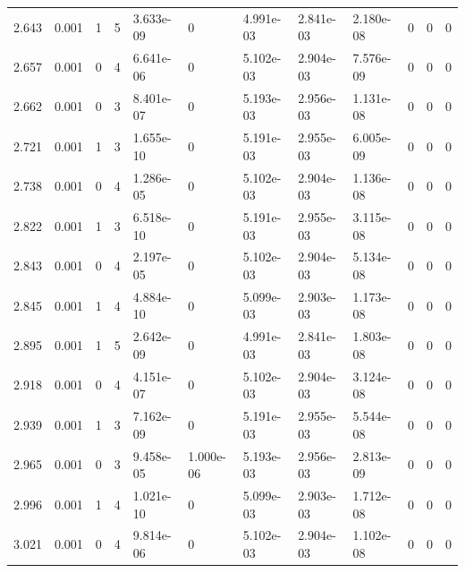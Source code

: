 \documentclass[preview]{standalone}
\begin{document}
{{{\begin{tabular}{L{1.2cm}C{1.2cm} C{0.3cm}C{0.5cm} C{1.4cm}C{1.4cm} C{1.4cm}C{1.4cm} C{1.6cm}C{1.6cm} C{1.6cm}C{1.6cm}}
  2.643  &  0.001  & 1     &  5 &  3.633e-09  & 0  &  4.991e-03&   2.841e-03& 2.180e-08 & 0   &  0 & 0  \\ 
  2.657  &  0.001  & 0     &  4 &  6.641e-06  & 0  &  5.102e-03&   2.904e-03& 7.576e-09 & 0   &  0 & 0  \\ 
  2.662  &  0.001  & 0     &  3 &  8.401e-07  & 0  &  5.193e-03&   2.956e-03& 1.131e-08 & 0   &  0 & 0  \\ 
  2.721  &  0.001  & 1     &  3 &  1.655e-10  & 0  &  5.191e-03&   2.955e-03& 6.005e-09 & 0   &  0 & 0  \\ 
  2.738  &  0.001  & 0     &  4 &  1.286e-05  & 0  &  5.102e-03&   2.904e-03& 1.136e-08 & 0   &  0 & 0  \\ 
  2.822  &  0.001  & 1     &  3 &  6.518e-10  & 0  &  5.191e-03&   2.955e-03& 3.115e-08 & 0   &  0 & 0  \\ 
  2.843  &  0.001  & 0     &  4 &  2.197e-05  & 0  &  5.102e-03&   2.904e-03& 5.134e-08 & 0   &  0 & 0  \\ 
  2.845  &  0.001  & 1     &  4 &  4.884e-10  & 0  &  5.099e-03&   2.903e-03& 1.173e-08 & 0   &  0 & 0  \\ 
  2.895  &  0.001  & 1     &  5 &  2.642e-09  & 0  &  4.991e-03&   2.841e-03& 1.803e-08 & 0   &  0 & 0  \\ 
  2.918  &  0.001  & 0     &  4 &  4.151e-07  & 0  &  5.102e-03&   2.904e-03& 3.124e-08 & 0   &  0 & 0  \\ 
  2.939  &  0.001  & 1     &  3 &  7.162e-09  & 0  &  5.191e-03&   2.955e-03& 5.544e-08 & 0   &  0 & 0  \\ 
  2.965  &  0.001  & 0     &  3 &  9.458e-05  & 1.000e-06  &  5.193e-03&   2.956e-03& 2.813e-09 & 0   &  0 & 0  \\ 
  2.996  &  0.001  & 1     &  4 &  1.021e-10  & 0  &  5.099e-03&   2.903e-03& 1.712e-08 & 0   &  0 & 0  \\ 
  3.021  &  0.001  & 0     &  4 &  9.814e-06  & 0  &  5.102e-03&   2.904e-03& 1.102e-08 & 0   &  0 & 0  \\ 
\hline 
\end{tabular} 

}}}
\end{document}
